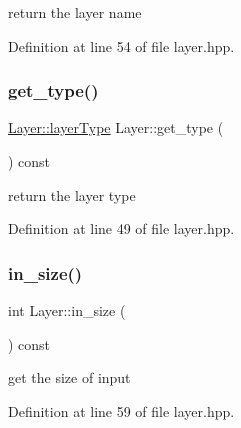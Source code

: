 return the layer name 



Definition at line 54 of file layer.\+hpp.

\mbox{\label{class_layer_a0c280024394acfdf10c7b357a952f258}} 
\subsubsection{\texorpdfstring{get\+\_\+type()}{get\_type()}}
{\footnotesize\ttfamily \hyperlink{class_layer_a823f18343920cda4f52dce36df6e851f}{Layer\+::layer\+Type} Layer\+::get\+\_\+type (\begin{DoxyParamCaption}{ }\end{DoxyParamCaption}) const}



return the layer type 



Definition at line 49 of file layer.\+hpp.

\mbox{\label{class_layer_af2aa113e9b7938188d8da55b6950d0e5}} 
\subsubsection{\texorpdfstring{in\+\_\+size()}{in\_size()}}
{\footnotesize\ttfamily int Layer\+::in\+\_\+size (\begin{DoxyParamCaption}{ }\end{DoxyParamCaption}) const}



get the size of input 



Definition at line 59 of file layer.\+hpp.

\mbox{\label{class_layer_aab662b9c8e61cd7375cbb4413d2e3037}} 
